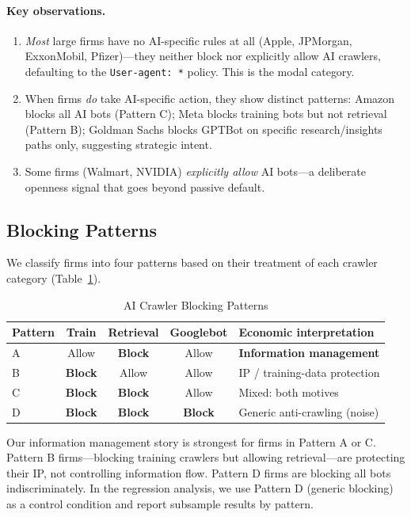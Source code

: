 \documentclass[12pt,a4paper]{article}
\begin{document}
\paragraph{Key observations.}
\begin{enumerate}
    \item \emph{Most} large firms have no AI-specific rules at all (Apple, JPMorgan, ExxonMobil, Pfizer)---they neither block nor explicitly allow AI crawlers, defaulting to the \texttt{User-agent: *} policy. This is the modal category.
    \item When firms \emph{do} take AI-specific action, they show distinct patterns: Amazon blocks all AI bots (Pattern C); Meta blocks training bots but not retrieval (Pattern B); Goldman Sachs blocks GPTBot on specific research/insights paths only, suggesting strategic intent.
    \item Some firms (Walmart, NVIDIA) \emph{explicitly allow} AI bots---a deliberate openness signal that goes beyond passive default.
\end{enumerate}

\subsection{Blocking Patterns}

We classify firms into four patterns based on their treatment of each crawler category (Table~\ref{tab:blocking_patterns}).

\begin{table}[htbp]
\centering
\caption{AI Crawler Blocking Patterns}
\label{tab:blocking_patterns}
\small
\begin{tabularx}{\textwidth}{lcccp{5cm}}
\toprule
\textbf{Pattern} & \textbf{Train} & \textbf{Retrieval} & \textbf{Googlebot} & \textbf{Economic interpretation} \\
\midrule
A & Allow & \textbf{Block} & Allow & \textbf{Information management} \\
B & \textbf{Block} & Allow & Allow & IP / training-data protection \\
C & \textbf{Block} & \textbf{Block} & Allow & Mixed: both motives \\
D & \textbf{Block} & \textbf{Block} & \textbf{Block} & Generic anti-crawling (noise) \\
\bottomrule
\end{tabularx}
\end{table}

\noindent Our information management story is strongest for firms in Pattern A or C. Pattern B firms---blocking training crawlers but allowing retrieval---are protecting their IP, not controlling information flow. Pattern D firms are blocking all bots indiscriminately. In the regression analysis, we use Pattern D (generic blocking) as a control condition and report subsample results by pattern.
\end{document}
